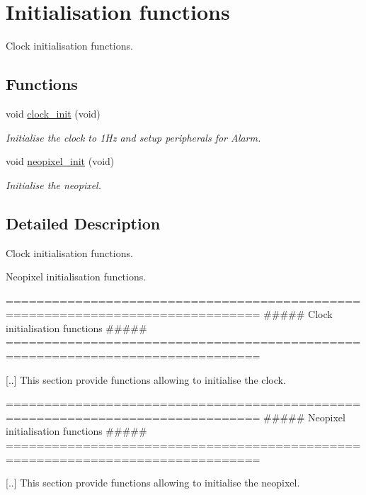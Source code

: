 \hypertarget{group___initialisation}{}\section{Initialisation functions}
\label{group___initialisation}


Clock initialisation functions.  


\subsection*{Functions}
\begin{DoxyCompactItemize}
\item 
void \hyperlink{group___initialisation_ga78ab77b57cf2e00089f0a3a22508524c}{clock\+\_\+init} (void)
\begin{DoxyCompactList}\small\item\em Initialise the clock to 1\+Hz and setup peripherals for Alarm. \end{DoxyCompactList}\item 
void \hyperlink{group___initialisation_gaac78468985e44a3e4d353ea9276b33bc}{neopixel\+\_\+init} (void)
\begin{DoxyCompactList}\small\item\em Initialise the neopixel. \end{DoxyCompactList}\end{DoxyCompactItemize}


\subsection{Detailed Description}
Clock initialisation functions. 

Neopixel initialisation functions.

\begin{DoxyVerb} ===============================================================================
         ##### Clock initialisation functions #####
 ===============================================================================

 [..] This section provide functions allowing to initialise the clock.\end{DoxyVerb}


\begin{DoxyVerb} ===============================================================================
         ##### Neopixel initialisation functions #####
 ===============================================================================

 [..] This section provide functions allowing to initialise the neopixel.\end{DoxyVerb}
 


